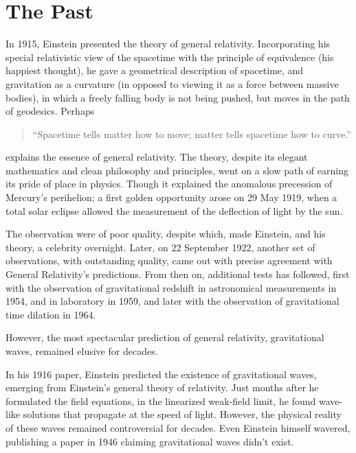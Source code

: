\section{The Past}\label{sec:the-past}
In 1915, Einstein presented the theory of general relativity.
Incorporating his special relativistic view of the spacetime with the principle of equivalence (his happiest thought), he gave a geometrical description of spacetime, and gravitation as a curvature (in opposed to viewing it as a force between massive bodies), in which a freely falling body is not being pushed, but moves in the path of geodesics.
Perhaps

\begin{quote}
    ``Spacetime tells matter how to move; matter tells spacetime how to curve.''\cite{misner_gravitation_2017}
\end{quote}

explains the essence of general relativity.
The theory, despite its elegant mathematics and clean philosophy and principles, went on a slow path of earning its pride of place in physics.
Though it explained the anomalous precession of Mercury's perihelion; a first golden opportunity arose on 29 May 1919, when a total solar eclipse allowed the measurement of the deflection of light by the sun\cite{dyson_ix_1920}.

The observation were of poor quality, despite which, made Einstein, and his theory, a celebrity overnight.
Later, on 22 September 1922, another set of observations, with outstanding quality, came out with precise agreement with General Relativity's predictions\cite{campbell_observations_1923}.
From then on, additional tests has followed, first with the observation of gravitational redshift in astronomical measurements in 1954\cite{popper_red_1954}, and in laboratory in 1959\cite{pound_apparent_1960}, and later with the observation of gravitational time dilation in 1964\cite{shapiro_fourth_1964}.

However, the most spectacular prediction of general relativity, gravitational waves, remained elusive for decades.

In his 1916 paper, Einstein predicted the existence of gravitational waves\cite{einstein_grundlage_1922}, emerging from Einstein's general theory of relativity.
Just months after he formulated the field equations, in the linearized weak-field limit, he found wave-like solutions that propagate at the speed of light.
However, the physical reality of these waves remained controversial for decades.
Even Einstein himself wavered, publishing a paper in 1946 claiming gravitational waves didn't exist.


